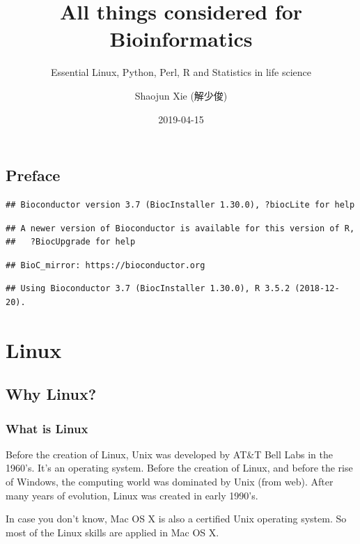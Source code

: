 \documentclass[]{book}
\title{All things considered for Bioinformatics}
\subtitle{Essential Linux, Python, Perl, R and Statistics in life science}
\author{Shaojun Xie (解少俊)}
\date{2019-04-15}
\begin{document}
\maketitle

{
\setcounter{tocdepth}{1}
\tableofcontents
}
\hypertarget{preface}{%
\chapter*{Preface}\label{preface}}

\begin{verbatim}
## Bioconductor version 3.7 (BiocInstaller 1.30.0), ?biocLite for help
\end{verbatim}

\begin{verbatim}
## A newer version of Bioconductor is available for this version of R,
##   ?BiocUpgrade for help
\end{verbatim}

\begin{verbatim}
## BioC_mirror: https://bioconductor.org
\end{verbatim}

\begin{verbatim}
## Using Bioconductor 3.7 (BiocInstaller 1.30.0), R 3.5.2 (2018-12-20).
\end{verbatim}

\hypertarget{part-linux}{%
\part{Linux}\label{part-linux}}

\hypertarget{why-linux}{%
\chapter{Why Linux?}\label{why-linux}}

\hypertarget{what-is-linux}{%
\section{What is Linux}\label{what-is-linux}}

Before the creation of Linux, Unix was developed by AT\&T Bell Labs in the 1960's. It's an operating system. Before the creation of Linux, and before the rise of Windows, the computing world was dominated by Unix (from web). After many years of evolution, Linux was created in early 1990's.

In case you don't know, Mac OS X is also a certified Unix operating system. So most of the Linux skills are applied in Mac OS X.
\end{document}
